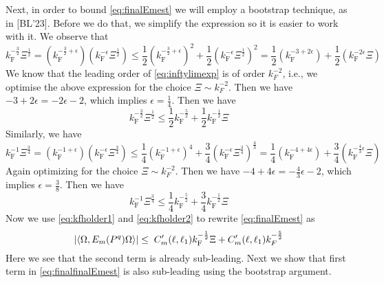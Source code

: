 \documentclass[12pt,a4paper]{article}
\numberwithin{equation}{section}
\newcommand{\1}{\mathbb{I}}
\newcommand{\F}{\mathrm{F}}
\newcommand{\half}{\frac{1}{2}}
\newcommand{\eva}[1]{\left\langle #1 \right\rangle}
\theoremstyle{plain}
\theoremstyle{definition}
\theoremstyle{remark}
\theoremstyle{plain}
\theoremstyle{definition}
\theoremstyle{remark}
\begin{document}
Next, in order to bound \eqref{eq:finalEmest} we will employ a bootstrap technique, as in [BL'23]. Before we do that, we simplify the expression so it is easier to work with it.
We observe that 
\begin{equation}
	k_{\F}^{-\frac{3}{2}} \Xi^\half = (k_{\F}^{-\frac{3}{2} +\epsilon} ) (k_{\F}^{-\epsilon} \Xi^\half) \leq \half(k_{\F}^{-\frac{3}{2} +\epsilon} )^2 + \half(k_{\F}^{-\epsilon} \Xi^\half)^2 = \half(k_{\F}^{-3 +2\epsilon}) + \half(k_{\F}^{-2\epsilon} \Xi)
\end{equation}
We know that the leading order of \eqref{eq:inftylimexp} is of order $k_F^{-2}$, i.e., we optimise the above expression for the choice $\Xi \sim k_F^{-2}$. Then we have $-3 +2\epsilon = -2\epsilon -2 $, which implies $\epsilon =\frac{1}{4}$. 
Then we have  
\begin{equation} \label{eq:kfholder1}
	k_{\F}^{-\frac{3}{2}} \Xi^\half \leq \half k_{\F}^{-\frac{5}{2}} + \half k_{\F}^{-\half} \Xi
\end{equation}
Similarly, we have
\begin{equation}
	k_{\F}^{-1} \Xi^{\frac{3}{4}} = (k_{\F}^{-1 +\epsilon} ) (k_{\F}^{-\epsilon} \Xi^{\frac{3}{4}}) \leq \frac{1}{4}(k_{\F}^{-1 +\epsilon} )^4 + \frac{3}{4}(k_{\F}^{-\epsilon} \Xi^{\frac{3}{4}})^\frac{4}{3} = \frac{1}{4}(k_{\F}^{-4 +4\epsilon}) + \frac{3}{4}(k_{\F}^{-\frac{4}{3}\epsilon} \Xi)
\end{equation}
Again optimizing for the choice $\Xi \sim k_F^{-2}$. Then we have $-4 +4\epsilon = -\frac{4}{3}\epsilon -2 $, which implies $\epsilon =\frac{3}{8}$. Then we have
\begin{equation} \label{eq:kfholder2}
	k_{\F}^{-1} \Xi^{\frac{3}{4}} \leq \frac{1}{4} k_{\F}^{-\frac{5}{2}} + \frac{3}{4} k_{\F}^{-\half} \Xi
\end{equation}
Now we use \eqref{eq:kfholder1} and \eqref{eq:kfholder2} to rewrite \eqref{eq:finalEmest} as
\begin{equation}
		\abs{\eva{\Omega, E_m(P^q) \Omega}} \leq \; C'_m(\ell,\ell_1) k_{\F}^{-\half}\Xi + C'_m(\ell,\ell_1)k_F^{-\frac{5}{2}} \label{eq:finalfinalEmest}
\end{equation}
Here we see that the second term is already sub-leading.
Next we show that first term in \eqref{eq:finalfinalEmest} is also sub-leading using the bootstrap argument.
\end{document}
